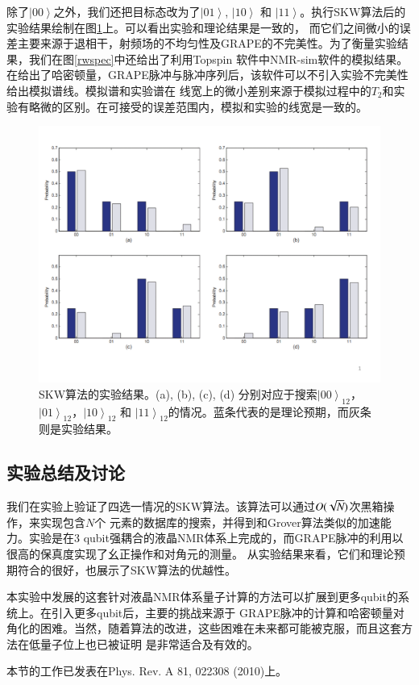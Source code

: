 除了$\left\vert 00 \right\rangle$之外，我们还把目标态改为了$\left\vert 01 \right\rangle$, $\left\vert 10
\right\rangle$ 和 $\left\vert 11 \right\rangle$。执行SKW算法后的实验结果绘制在图\ref{rwresult}上。可以看出实验和理论结果是一致的，
而它们之间微小的误差主要来源于退相干，射频场的不均匀性及GRAPE的不完美性。为了衡量实验结果，我们在图\ref{rwspec}中还给出了利用Topspin
软件中NMR-sim软件的模拟结果。在给出了哈密顿量，GRAPE脉冲与脉冲序列后，该软件可以不引入实验不完美性给出模拟谱线。模拟谱和实验谱在
线宽上的微小差别来源于模拟过程中的$T_2$和实验有略微的区别。在可接受的误差范围内，模拟和实验的线宽是一致的。


\begin{figure}[htbp]
            \begin{center}
              \includegraphics[width= 0.8\columnwidth]{figures/rwresult.pdf}
              \caption{SKW算法的实验结果。(a), (b), (c), (d) 分别对应于搜索$\left\vert 00 \right\rangle_{12}$， $\left\vert 01
\right\rangle_{12}$，$\left\vert 10 \right\rangle_{12}$ 和
$\left\vert 11 \right\rangle_{12}$的情况。蓝条代表的是理论预期，而灰条则是实验结果。}
              \label{rwresult}
            \end{center}
 \end{figure}

\subsection{实验总结及讨论}

我们在实验上验证了四选一情况的SKW算法。该算法可以通过$\emph{O}(\sqrt{\emph{N}})$次黑箱操作，来实现包含$N$个
元素的数据库的搜索，并得到和Grover算法类似的加速能力。实验是在3 qubit强耦合的液晶NMR体系上完成的，而GRAPE脉冲的利用以很高的保真度实现了幺正操作和对角元的测量。
从实验结果来看，它们和理论预期符合的很好，也展示了SKW算法的优越性。

本实验中发展的这套针对液晶NMR体系量子计算的方法可以扩展到更多qubit的系统上。在引入更多qubit后，主要的挑战来源于
GRAPE脉冲的计算和哈密顿量对角化的困难。当然，随着算法的改进，这些困难在未来都可能被克服，而且这套方法在低量子位上也已被证明
是非常适合及有效的。

本节的工作已发表在Phys. Rev. A 81, 022308 (2010)\cite{rw1}上。 